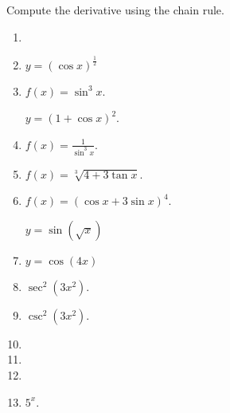 Compute the derivative using the chain rule.
\begin{multicols}{2}
\begin{enumerate}[ref={\fcProblemRef}]
\item 
\item 
{} \label{problemd/dx((cosx)^(1/2))} $y = (\cos x)^{\frac{1}{2}}$


\item $\displaystyle f(x)=\sin^3 x$.

 \label{problemd/dx((1+cosx)^2)}  $y = (1+\cos x)^2$.


\item   $\displaystyle f(x)=\frac{1}{\sin^3x}$.

\item  $\displaystyle f(x)= \sqrt[3]{4+3\tan x}$.

\item  $f(x)=(\cos x + 3\sin x)^4$.


 \label{problemd/dx(sin(sqrt(x)))}  $\displaystyle y = \sin \left( \sqrt{x}\right)$

\item  $y = \cos\left( 4x\right)$


\item $\sec^2 (3x^2)$. 


\item $\csc^2 (3x^2)$. 

\item 
\item 
\item 
\item $5^{x}$.


\end{enumerate}
\end{multicols}
